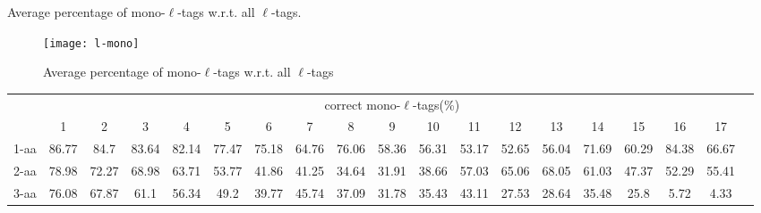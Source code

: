 \documentclass{article}[12pt]
\begin{document}
\begin{landscape}
\begin{table}[h]
\caption{ Average percentage of mono-$\ell$-tags w.r.t. all $\ell$-tags.}
\label{table:l-mono}

\vspace{3mm}
\end{table}
\end{landscape}

\begin{figure}
  \begin{center}
\texttt{[image: l-mono]}
\end{center}
\caption{Average percentage of mono-$\ell$-tags w.r.t. all $\ell$-tags}
  \label{fig:l-mono}
\end{figure}


\begin{landscape}

\begin{table}[h]\tiny
\vspace{3mm}
{\centering
\begin{center}
\begin{tabular}{|l|c|c|c|c|c|c|c|c|c|c|c|c|c|c|c|c|c|c|}
  \hline
  & \multicolumn{ 17 }{|c|}{correct mono-$\ell$-tags(\%)} \\
  \cline{2- 18}
    & 1 & 2 & 3 & 4 & 5 & 6 & 7 & 8 & 9 & 10 & 11 & 12 & 13 & 14 & 15 & 16 & 17\\
  \hline
1-aa  & 86.77 & 84.7 & 83.64 & 82.14 & 77.47 & 75.18 & 64.76 & 76.06 & 58.36 & 56.31 & 53.17 & 52.65 & 56.04 & 71.69 & 60.29 & 84.38 & 66.67\\
2-aa  & 78.98 & 72.27 & 68.98 & 63.71 & 53.77 & 41.86 & 41.25 & 34.64 & 31.91 & 38.66 & 57.03 & 65.06 & 68.05 & 61.03 & 47.37 & 52.29 & 55.41\\
3-aa  & 76.08 & 67.87 & 61.1 & 56.34 & 49.2 & 39.77 & 45.74 & 37.09 & 31.78 & 35.43 & 43.11 & 27.53 & 28.64 & 35.48 & 25.8 & 5.72 & 4.33\\
 \hline
\end{tabular}
\end{center}
\par}
\centering


\end{table}
\end{landscape}
\end{document}
